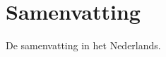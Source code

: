 \documentclass[../phdthesis.tex]{subfiles}
\begin{document}
\ifSubfilesClassLoaded{\backmatter}{}
\chapter{Samenvatting}
\begin{otherlanguage}{dutch}
	De samenvatting in het Nederlands.
\end{otherlanguage}

\end{document}

